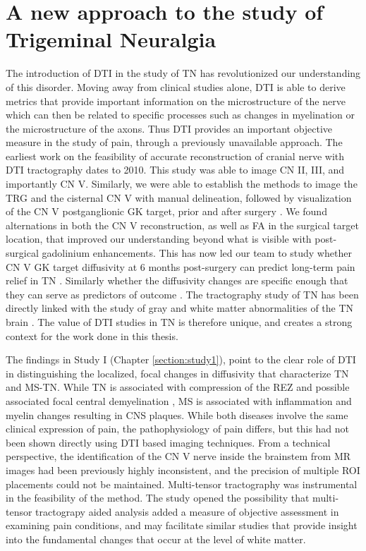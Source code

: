 \section{A new approach to the study of Trigeminal Neuralgia}


The introduction of DTI in the study of TN has revolutionized our understanding of this disorder. Moving away from clinical studies alone, DTI is able to derive metrics that provide important information on the microstructure of the nerve which can then be related to specific processes such as changes in myelination or the microstructure of the axons. Thus DTI provides an important objective measure in the study of pain, through a previously unavailable approach. The earliest work on the feasibility of accurate reconstruction of cranial nerve with DTI tractography \cite{Hodaie2010} dates to 2010. This study was able to image CN II, III, and importantly CN V. Similarly, we were able to establish the methods to image the TRG and the cisternal CN V with manual delineation, followed by visualization of the CN V postganglionic GK target, prior and after surgery \cite{Hodaie2012g}. We found alternations in both the CN V reconstruction, as well as FA in the surgical target location, that improved our understanding beyond what is visible with post-surgical gadolinium enhancements. This has now led our team to study whether CN V GK target diffusivity at 6 months post-surgery can predict long-term pain relief in TN \cite{Tohyama2018}. Similarly whether the diffusivity changes are specific enough that they can serve as predictors of outcome \cite{Hung2017}. The tractography study of TN has been directly linked with the study of gray and white matter abnormalities of the TN brain \cite{Desouza2013c}. The value of DTI studies in TN is therefore unique, and creates a strong context for the work done in this thesis. 

The findings in Study I (Chapter \ref{section:study1}), point to the clear role of DTI in distinguishing the localized, focal changes in diffusivity that characterize TN and MS-TN. While TN is associated with compression of the REZ and possible associated focal central demyelination \cite{Devor2002a,Peker2006}, MS is associated with inflammation and myelin changes resulting in CNS plaques. While both diseases involve the same clinical expression of pain, the pathophysiology of pain differs, but this had not been shown directly using DTI based imaging techniques. From a technical perspective, the identification of the CN V nerve inside the brainstem from MR images had been previously highly inconsistent, and the precision of multiple ROI placements could not be maintained. Multi-tensor tractography was instrumental in the feasibility of the method. The study opened the possibility that multi-tensor tractograpy aided analysis added a measure of objective assessment in examining pain conditions, and may facilitate similar studies that provide insight into the fundamental changes that occur at the level of white matter. 

